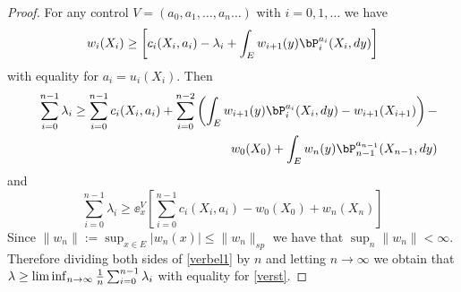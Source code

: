 \documentclass[10pt,english]{extarticle}
\begin{document}
\begin{proof} For any control $V=(a_0,a_1,\ldots, a_n\ldots)$ with $i=0,1,\ldots$ we have
\begin{equation}
w_i(X_i)\geq \left[c_i(X_i,a_i)-\lambda_i +\int_E w_{i+1}(y)\bP_i^{a_i}(X_i,dy)\right]
\end{equation}
with equality for $a_i=u_i(X_i)$. Then
\begin{eqnarray}\label{verbel}
&&\sum_{i=0}^{n-1} \lambda_i \geq \sum_{i=0}^{n-1} c_i(X_i,a_i)+ \sum_{i=0}^{n-2} \left(\int_E w_{i+1}(y)\bP_i^{a_i}(X_i,dy)- w_{i+1}(X_{i+1})\right)- \nonumber \\
&&w_0(X_0)+\int_E w_n(y)\bP_{n-1}^{a_{n-1}}(X_{n-1},dy)
\end{eqnarray}
and
\begin{equation}\label{verbel1}
\sum_{i=0}^{n-1} \lambda_i \geq \ee_x^V\left[\sum_{i=0}^{n-1} c_i(X_i,a_i)-w_0(X_0)+w_n(X_n)\right] 
\end{equation}
Since $\|w_n\|:=\sup_{x\in E}|w_n(x)|\leq \|w_n\|_{sp}$ we have that $\sup_n \|w_n\|<\infty$. Therefore  dividing both sides of \eqref{verbel1} by $n$ and letting $n\to \infty$ we obtain that 
$\lambda \geq \liminf_{n\to \infty} {1\over n} \sum_{i=0}^{n-1}\lambda_i$
with equality for \eqref{verst}. 


\end{proof}
\end{document}
